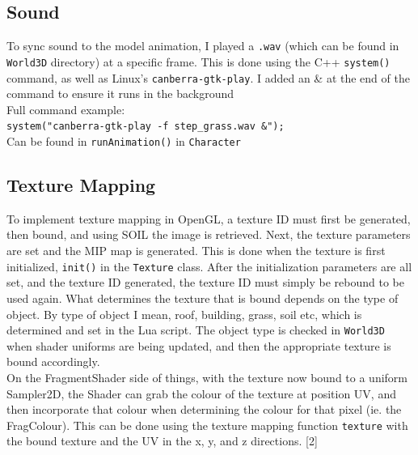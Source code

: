 \documentclass {article}
\begin{document}
\subsection{Sound}
To sync sound to the model animation, I played a \texttt{.wav} (which can be found in \texttt{World3D} directory) at a specific frame. This is done using the C++ \texttt{system()} command, as well as Linux's \texttt{canberra-gtk-play}. I added an \& at the end of the command to ensure it runs in the background \\ \newline
Full command example: \\
\texttt{system("canberra-gtk-play -f step{\_}grass.wav \&");} \\ \newline
Can be found in \texttt{runAnimation()} in \texttt{Character}

\subsection{Texture Mapping}
To implement texture mapping in OpenGL, a texture ID must first be generated, then bound, and using SOIL the image is retrieved. Next, the texture parameters are set and the MIP map is generated. This is done when the texture is first initialized, \texttt{init()} in the \texttt{Texture} class. After the initialization parameters are all set, and the texture ID generated, the texture ID must simply be rebound to be used again. What determines the texture that is bound depends on the type of object. By type of object I mean, roof, building, grass, soil etc, which is determined and set in the Lua script. The object type is checked in \texttt{World3D} when shader uniforms are being updated, and then the appropriate texture is bound accordingly.\\ \newline
On the FragmentShader side of things, with the texture now bound to a uniform Sampler2D, the Shader can grab the colour of the texture at position UV, and then incorporate that colour when determining the colour for that pixel (ie. the FragColour). This can be done using the texture mapping function \texttt{texture} with the bound texture and the UV in the x, y, and z directions. [2]
\end{document}
